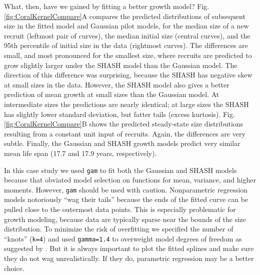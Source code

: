 \documentclass[12pt]{article}
\begin{document}
\begin{spacing}{1.35}
	What, then, have we gained by fitting a better growth model? 
	Fig. \ref{fig:CoralKernelCompare}A compares the predicted distributions of subsequent size in the fitted model and Gaussian pilot models, for the median size of a new recruit (leftmost pair of curves), the median initial size (central curves), and the 95th percentile of initial size in the data (rightmost curves). 
	The differences are small, and most pronounced for the smallest size, where recruits are predicted to grow slightly larger under the SHASH model than the Gaussian model. 
	The direction of this difference was surprising, because the SHASH has negative skew at small sizes in the data. 
	However, the SHASH model also gives a better prediction of mean growth at small sizes than the Gaussian model. 
	At intermediate sizes the predictions are nearly identical; at large sizes the SHASH has slightly lower standard deviation, but fatter tails (excess kurtosis).  
	Fig. \ref{fig:CoralKernelCompare}B shows the predicted steady-state size distributions resulting from a constant unit input of recruits. 
	Again, the differences are very subtle. 
	Finally, the Gaussian and SHASH growth models predict very similar mean life span (17.7 and 17.9 years, respectively).
	
	In this case study we used \texttt{gam} to fit both the Gaussian and SHASH models because that obviated model selection on functions for mean, variance, and higher moments. 
	However, \texttt{gam} should be used with caution. 
	Nonparametric regression models notoriously ``wag their tails'' because the ends of the fitted curve can be pulled close to the outermost data points. 
	This is especially problematic for growth modeling, because data are typically sparse near the bounds of the size distribution. 
	To minimize the risk of overfitting we specified the number of ``knots'' (\texttt{k=4}) and used \texttt{gamma=1.4} to overweight model degrees of freedom as suggested by \citet[][sec. 3.2]{gu-2013}. 
	But it is always important to plot the fitted splines and make sure they do not wag unrealistically. 
	If they do, parametric regression may be a better choice. 
	

\end{spacing}
\end{document}
